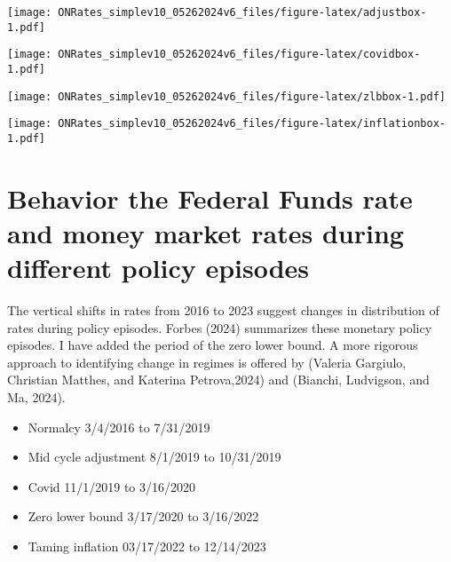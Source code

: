 \documentclass[
]{article}
\providecommand{\tightlist}{%
  \setlength{\itemsep}{0pt}\setlength{\parskip}{0pt}}
\let\origfigure\figure
\let\endorigfigure\endfigure
\renewenvironment{figure}[1][2] {
    \expandafter\origfigure\expandafter[H]
} {
    \endorigfigure
}
\begin{document}
\begin{figure}
\centering
\texttt{[image: ONRates\_simplev10\_05262024v6\_files/figure-latex/adjustbox-1.pdf]}
\caption{\label{fig:adjustbox}IQR and range of rates during mid cycle adustment period 8/1/2019-10/31/2019}
\end{figure}

\begin{figure}
\centering
\texttt{[image: ONRates\_simplev10\_05262024v6\_files/figure-latex/covidbox-1.pdf]}
\caption{\label{fig:covidbox}IQR and range of rates during covid period 11/1/2019-3/16/2020}
\end{figure}

\begin{figure}
\centering
\texttt{[image: ONRates\_simplev10\_05262024v6\_files/figure-latex/zlbbox-1.pdf]}
\caption{\label{fig:zlbbox}IQR and range of rates during zero lower bond period 3/17/2020-3/16/2022}
\end{figure}

\begin{figure}
\centering
\texttt{[image: ONRates\_simplev10\_05262024v6\_files/figure-latex/inflationbox-1.pdf]}
\caption{\label{fig:inflationbox}IQR and range of rates during inflation period 3/17/2022-12/14/2023}
\end{figure}

\hypertarget{behavior-the-federal-funds-rate-and-money-market-rates-during-different-policy-episodes}{%
\section{Behavior the Federal Funds rate and money market rates during different policy episodes}\label{behavior-the-federal-funds-rate-and-money-market-rates-during-different-policy-episodes}}

The vertical shifts in rates from 2016 to 2023 suggest changes in distribution of rates during policy episodes. Forbes (2024) summarizes these monetary policy episodes. I have added the period of the zero lower bound. A more rigorous approach to identifying change in regimes is offered by (Valeria Gargiulo, Christian Matthes, and Katerina Petrova,2024) and (Bianchi, Ludvigson, and Ma, 2024).

\begin{itemize}
\tightlist
\item
  Normalcy 3/4/2016 to 7/31/2019\\
\item
  Mid cycle adjustment 8/1/2019 to 10/31/2019\\
\item
  Covid 11/1/2019 to 3/16/2020\\
\item
  Zero lower bound 3/17/2020 to 3/16/2022\\
\item
  Taming inflation 03/17/2022 to 12/14/2023
\end{itemize}
\end{document}
